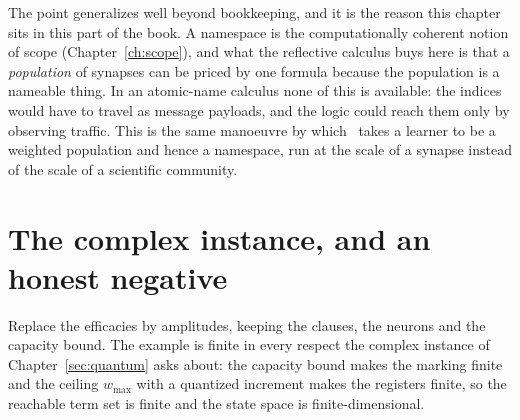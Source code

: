 The point generalizes well beyond bookkeeping, and it is the reason this chapter sits in
this part of the book. A namespace is the computationally coherent notion of scope
(Chapter~\ref{ch:scope}), and what the reflective calculus buys here is that a
\emph{population} of synapses can be priced by one formula because the population is a
nameable thing. In an atomic-name calculus none of this is available: the indices would
have to travel as message payloads, and the logic could reach them only by observing
traffic. This is the same manoeuvre by which \chComp\ takes a learner to be a weighted
population and hence a namespace, run at the scale of a synapse instead of the scale of a
scientific community.

\section{The complex instance, and an honest negative}

Replace the efficacies by amplitudes, keeping the clauses, the neurons and the capacity
bound. The example is finite in every respect the complex instance of
Chapter~\ref{sec:quantum} asks about: the capacity bound makes the marking finite and the
ceiling $w_{\max}$ with a quantized increment makes the registers finite, so the reachable
term set is finite and the state space is finite-dimensional.

